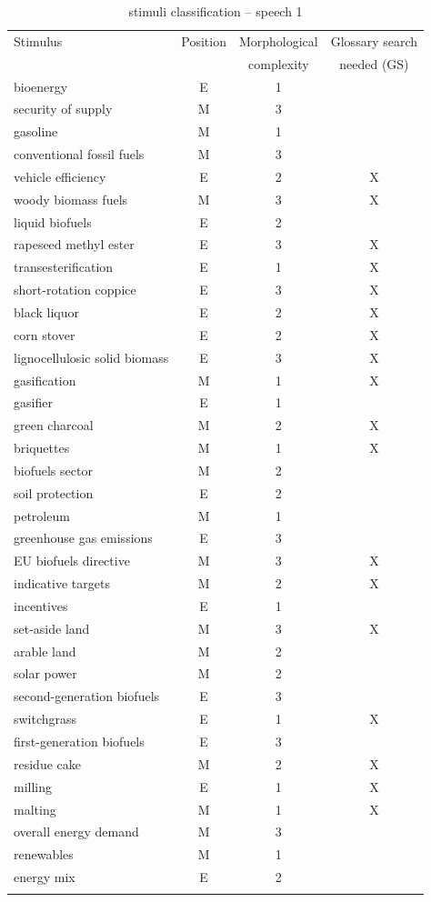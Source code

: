 \documentclass[output=paper]{langsci/langscibook}
\begin{document}
 

\begin{table}\footnotesize
	\caption{stimuli classification -- speech 1\label{tab:prandi:1}}
\begin{tabularx}{\linewidth}{Xccc}
\lsptoprule
{Stimulus} & {Position} & {Morphological} & {Glossary search}\\
		   &            &  complexity      & needed (GS)\\\midrule
bioenergy & E & 1 & \\
security of supply & M & 3 & \\
gasoline & M & 1 & \\
conventional fossil fuels & M & 3 & \\
vehicle efficiency & E & 2 & X\\
woody biomass fuels & M & 3 & X\\
liquid biofuels & E & 2 & \\
rapeseed methyl ester & E & 3 & X\\
transesterification & E & 1 & X\\
short-rotation coppice & E & 3 & X\\
black liquor & E & 2 & X\\
corn stover & E & 2 & X\\
lignocellulosic solid biomass & E & 3 & X\\
gasification & M & 1 & X\\
gasifier & E & 1 & \\
green charcoal & M & 2 & X\\
briquettes & M & 1 & X\\
biofuels sector & M & 2 & \\
soil protection & E & 2 & \\
petroleum & M & 1 & \\
greenhouse gas emissions & E & 3 & \\
EU biofuels directive & M & 3 & X\\
indicative targets & M & 2 & X\\
incentives & E & 1 & \\
set-aside land & M & 3 & X\\
arable land & M & 2 & \\
solar power & M & 2 & \\
second-generation biofuels & E & 3 & \\
switchgrass & E & 1 & X\\
first-generation biofuels & E & 3 & \\
residue cake & M & 2 & X\\
milling & E & 1 & X\\
malting & M & 1 & X\\
overall energy demand & M & 3 & \\
renewables & M & 1 & \\
energy mix & E & 2 & \\
\lspbottomrule
\end{tabularx}
\end{table}
\end{document}
